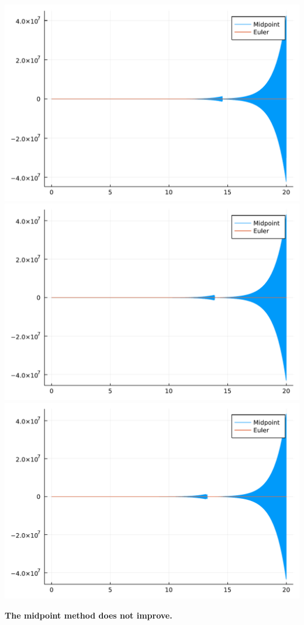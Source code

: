 \documentclass[12pt,a4paper]{article}
\begin{document}
\includegraphics[width=\linewidth]{figures/ass_1_report_13_1.pdf}
\includegraphics[width=\linewidth]{figures/ass_1_report_13_2.pdf}
\includegraphics[width=\linewidth]{figures/ass_1_report_13_3.pdf}

\textbf{The midpoint method does not improve.}
\end{document}
